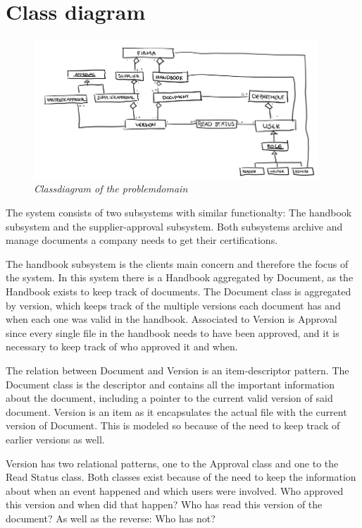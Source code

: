 \section{Class diagram}

\begin{figure}[H]
	\centering
	\includegraphics[width=0.95\textwidth]{billeder/classDiagram.png}
	\caption{\textit{Classdiagram of the problemdomain
	}}
	\label{fig:PACT-SystemImage}
\end{figure}

The system consists of two subsystems with similar functionalty:
The handbook subsystem and the supplier-approval subsystem.
Both subsystems archive and manage documents a company needs to get their certifications.

The handbook subsystem is the clients main concern and therefore the focus of the system. 
In this system there is a Handbook aggregated by Document, as the Handbook exists to keep track of documents. The Document class is aggregated by version, which keeps track of the multiple versions each document has and when each one was valid in the handbook. Associated to Version is Approval since every single file in the handbook needs to have been approved, and it is necessary to keep track of who approved it and when.

The relation between Document and Version is an item-descriptor pattern. The Document class is the descriptor and contains all the important information about the document, including a pointer to the current valid version of said document. Version is an item as it encapsulates the actual file with the current version of Document. This is modeled so because of the need to keep track of earlier versions as well.

Version has two relational patterns, one to the Approval class and one to the Read Status class. Both classes exist because of the need to keep the information about when an event happened and which users were involved. Who approved this version and when did that happen? Who has read this version of the document? As well as the reverse: Who has not?

